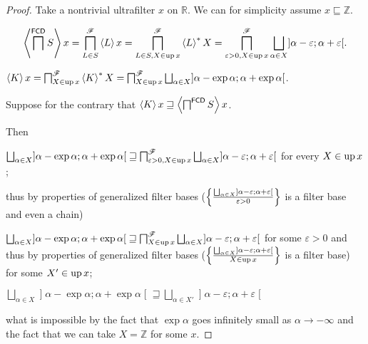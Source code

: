 \begin{proof}
  Take a nontrivial ultrafilter $x$ on $\mathbb{R}$. We can for simplicity
  assume $x \sqsubseteq \mathbb{Z}$.
  
  \[ \supfun{\bigsqcap^{\mathsf{FCD}} S} x =
  \bigsqcap^{\mathscr{F}}_{L \in S} \supfun{L} x =
  \bigsqcap^{\mathscr{F}}_{L \in S, X \in \up x} \rsupfun{L} X =
  \bigsqcap^{\mathscr{F}}_{\varepsilon > 0, X \in \up
  x} \bigsqcup_{\alpha \in X} \mathopen] \alpha - \varepsilon ; \alpha + \varepsilon \mathclose[. \]
  
  $\supfun{K} x = \bigsqcap^{\mathscr{F}}_{X \in \up x} \rsupfun{K} X =
  \bigsqcap^{\mathscr{F}}_{X \in \up x}
  \bigsqcup_{\alpha \in X}\mathopen] \alpha - \exp \alpha ; \alpha + \exp \alpha \mathclose[$.
  
  Suppose for the contrary that $\left\langle K\right\rangle x \sqsupseteq \left\langle 
  \bigsqcap^{\mathsf{FCD}} S \right\rangle x$.
  
  Then
  
  $\bigsqcup_{\alpha \in X} \mathopen] \alpha - \exp \alpha ; \alpha + \exp \alpha \mathclose[
  \sqsupseteq \bigsqcap^{\mathscr{F}}_{\varepsilon > 0, X \in \up x}
  \bigsqcup_{\alpha \in X} \mathopen] \alpha - \varepsilon ; \alpha + \varepsilon \mathclose[$ for
  every $X \in \operatorname{up} x$;
  
  thus by properties of generalized filter bases ($\setcond{ \bigsqcup_{\alpha
  \in X} \mathopen] \alpha - \varepsilon ; \alpha + \varepsilon \mathclose[ }{
  \varepsilon > 0 }$ is a filter base and even a chain)
  
  $\bigsqcup_{\alpha \in X} \mathopen] \alpha - \exp \alpha ; \alpha + \exp \alpha \mathclose[
  \sqsupseteq \bigsqcap^{\mathscr{F}}_{X \in \up x} \bigsqcup_{\alpha
  \in X} \mathopen] \alpha - \varepsilon ; \alpha + \varepsilon \mathclose[$ for some $\varepsilon
  > 0$ and thus
  by properties of generalized filter bases ($\setcond{ \bigsqcup_{\alpha \in
  X} \mathopen] \alpha - \varepsilon ; \alpha + \varepsilon \mathclose[ }{
  X \in \up x }$ is a filter base) for some $X' \in \operatorname{up} x$;
  
  $\bigsqcup_{\alpha \in X} \mathopen] \alpha - \exp \alpha ; \alpha + \exp \alpha \mathclose[
  \sqsupseteq \bigsqcup_{\alpha \in X'} \mathopen] \alpha - \varepsilon ; \alpha +
  \varepsilon \mathclose[$
  
  what is impossible by the fact that $\exp \alpha$ goes infinitely small as
  $\alpha \rightarrow - \infty$ and the fact that we can take $X =\mathbb{Z}$
  for some $x$.
\end{proof}

